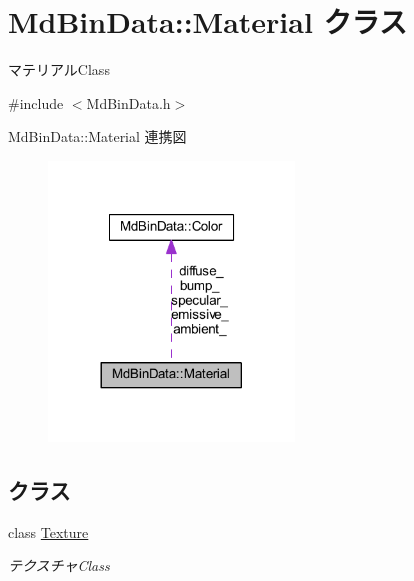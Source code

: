 \hypertarget{class_md_bin_data_1_1_material}{}\section{Md\+Bin\+Data\+:\+:Material クラス}
\label{class_md_bin_data_1_1_material}


マテリアル\+Class  




{\ttfamily \#include $<$Md\+Bin\+Data.\+h$>$}



Md\+Bin\+Data\+:\+:Material 連携図
\nopagebreak
\begin{figure}[H]
\begin{center}
\leavevmode
\includegraphics[width=185pt]{class_md_bin_data_1_1_material__coll__graph}
\end{center}
\end{figure}
\subsection*{クラス}
\begin{DoxyCompactItemize}
\item 
class \mbox{\hyperlink{class_md_bin_data_1_1_material_1_1_texture}{Texture}}
\begin{DoxyCompactList}\small\item\em テクスチャ\+Class \end{DoxyCompactList}\end{DoxyCompactItemize}
